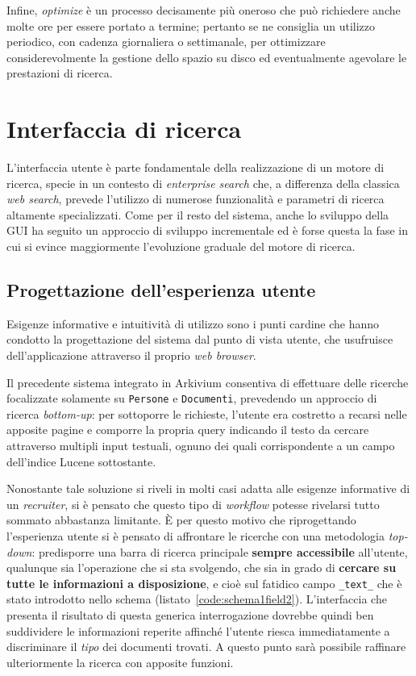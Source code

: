 Infine, \textit{optimize} è un processo decisamente più oneroso che può richiedere anche molte ore per essere portato a termine; pertanto se ne consiglia un utilizzo periodico, con cadenza giornaliera o settimanale, per ottimizzare considerevolmente la gestione dello spazio su disco ed eventualmente agevolare le prestazioni di ricerca.




\section{Interfaccia di ricerca}

L’interfaccia utente è parte fondamentale della realizzazione di un motore di ricerca, specie in un contesto di \textit{enterprise search} che, a differenza della classica \textit{web search}, prevede l’utilizzo di numerose funzionalità e parametri di ricerca altamente specializzati. Come per il resto del sistema, anche lo sviluppo della GUI ha seguito un approccio di sviluppo incrementale ed è forse questa la fase in cui si evince maggiormente l’evoluzione graduale del motore di ricerca.



\subsection{Progettazione dell’esperienza utente}

Esigenze informative e intuitività di utilizzo sono i punti cardine che hanno condotto la progettazione del sistema dal punto di vista utente, che usufruisce dell’applicazione attraverso il proprio \textit{web browser}.

\vspace{1em}

Il precedente sistema integrato in Arkivium consentiva di effettuare delle ricerche focalizzate solamente su \texttt{Persone} e \texttt{Documenti}, prevedendo un approccio di ricerca \textit{bottom-up}: per sottoporre le richieste, l'utente era costretto a recarsi nelle apposite pagine e comporre la propria query indicando il testo da cercare attraverso multipli input testuali, ognuno dei quali corrispondente a un campo dell’indice Lucene sottostante.

Nonostante tale soluzione si riveli in molti casi adatta alle esigenze informative di un \textit{recruiter}, si è pensato che questo tipo di \textit{workflow} potesse rivelarsi tutto sommato abbastanza limitante. È per questo motivo che riprogettando l’esperienza utente si è pensato di affrontare le ricerche con una metodologia \textit{top-down}: predisporre una barra di ricerca principale \textbf{sempre accessibile} all’utente, qualunque sia l’operazione che si sta svolgendo, che sia in grado di \textbf{cercare su tutte le informazioni a disposizione}, e cioè sul fatidico campo \texttt{\_text\_} che è stato introdotto nello schema (listato~\ref{code:schema1field2}). L’interfaccia che presenta il risultato di questa generica interrogazione dovrebbe quindi ben suddividere le informazioni reperite affinché l’utente riesca immediatamente a discriminare il \textit{tipo} dei documenti trovati. A questo punto sarà possibile raffinare ulteriormente la ricerca con apposite funzioni.

